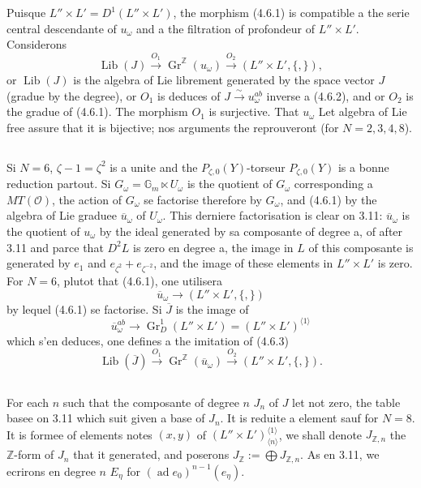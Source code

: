 \documentclass[11pt,a4paper]{article}
\theoremstyle{plain}
\theoremstyle{definition}
\DeclareMathOperator{\Lib}{Lib}
\DeclareMathOperator{\ad}{ad}
\newcommand{\Gm}{\mathbb{G}_m}
\newcommand{\Z}{\mathbb{Z}}
\newcommand{\Gr}{\operatorname{Gr}}
\begin{document}
Puisque $L'' \times L' = D^1(L'' \times L')$, the morphism (4.6.1) is compatible a the serie central descendante of $u_\omega$ and a the filtration of profondeur of $L'' \times L'$. Considerons
\begin{equation}\label{eq:4.6.3}
\Lib(J) \xrightarrow{O_1} \Gr^\Z(u_\omega) \xrightarrow{O_2} (L'' \times L', \{,\}),
\end{equation}
or $\Lib(J)$ is the algebra of Lie librement generated by the space vector $J$ (gradue by the degree), or $O_1$ is deduces of $J \xrightarrow{\sim} u_\omega^{ab}$ inverse a (4.6.2), and or $O_2$ is the gradue of (4.6.1). The morphism $O_1$ is surjective. That $u_\omega$ Let algebra of Lie free assure that it is bijective; nos arguments the reprouveront (for $N=2,3,4,8$).

\subsection{}
Si $N=6$, $\zeta - 1 = \zeta^2$ is a unite and the $P_{\zeta,0}(Y)$-torseur $P_{\zeta,0}(Y)$ is a bonne reduction partout. Si $G_\omega = \Gm \ltimes U_\omega$ is the quotient of $G_\omega$ corresponding a $MT(\mathcal{O})$, the action of $G_\omega$ se factorise therefore by $G_\omega$, and (4.6.1) by the algebra of Lie graduee $\overline{u}_\omega$ of $U_\omega$. This derniere factorisation is clear on 3.11: $\overline{u}_\omega$ is the quotient of $u_\omega$ by the ideal generated by sa composante of degree a, of after 3.11 and parce that $D^2L$ is zero en degree a, the image in $L$ of this composante is generated by $e_1$ and $e_{\zeta^2} + e_{\zeta^{-2}}$, and the image of these elements in $L'' \times L'$ is zero. For $N=6$, plutot that (4.6.1), one utilisera
\begin{equation}\label{eq:4.7.1}
\overline{u}_\omega \to (L'' \times L', \{,\})
\end{equation}
by lequel (4.6.1) se factorise. Si $\overline{J}$ is the image of
\begin{equation}\label{eq:4.7.2}
\overline{u}_\omega^{ab} \to \Gr_D^1(L'' \times L') = (L'' \times L')^{\langle 1 \rangle}
\end{equation}
which s'en deduces, one defines a the imitation of (4.6.3)
\begin{equation}\label{eq:4.7.3}
\Lib(\overline{J}) \xrightarrow{O_1} \Gr^\Z(\overline{u}_\omega) \xrightarrow{O_2} (L'' \times L', \{,\}).
\end{equation}

\subsection{}
For each $n$ such that the composante of degree $n$ $J_n$ of $J$ let not zero, the table basee on 3.11 which suit given a base of $J_n$. It is reduite a element sauf for $N=8$. It is formee of elements notes $(x,y)$ of $(L'' \times L')^{\langle 1 \rangle}_{\langle n \rangle}$, we shall denote $J_{\Z,n}$ the $\Z$-form of $J_n$ that it generated, and poserons $J_\Z := \bigoplus J_{\Z,n}$. As en 3.11, we ecrirons en degree $n$ $E_\eta$ for $(\ad e_0)^{n-1}(e_\eta)$.
\end{document}

